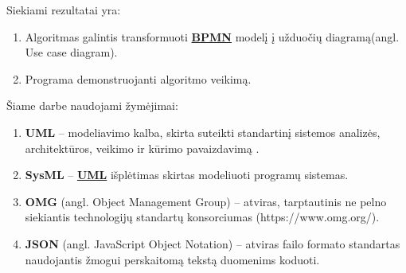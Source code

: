 \documentclass{VUMIFInfBakalaurinis}
\newcommand{\bhyperref}[2]{\hyperref[#1]{\textbf{#2}}}
\newcommand{\BPMN}{\bhyperref{section:bpmn}{BPMN}}
\newcommand{\UML}{\bhyperref{def:uml}{UML}}
\begin{document}
Siekiami rezultatai yra:
\begin{enumerate}
	\item Algoritmas galintis transformuoti \BPMN{} modelį į užduočių diagramą(angl. Use case diagram).
	\item Programa demonstruojanti algoritmo veikimą.
\end{enumerate}







\printbibliography[heading=bibintoc] %

Šiame darbe naudojami žymėjimai:
\begin{enumerate}
	\item \textbf{UML} – modeliavimo kalba, skirta suteikti standartinį sistemos analizės, architektūros, veikimo ir kūrimo pavaizdavimą \cite{omgUmlFormal}. \label{def:uml}
	\item \textbf{SysML} – \UML{} išplėtimas skirtas modeliuoti programų sistemas. \cite{OMGSysML} \label{def:sysml}
	\item \textbf{OMG} (angl. Object Management Group) – atviras, tarptautinis ne pelno siekiantis technologijų standartų konsorciumas (https://www.omg.org/). \label{def:omg}
  \item \textbf{JSON} (angl. JavaScript Object Notation) – atviras failo formato standartas naudojantis žmogui perskaitomą tekstą duomenims koduoti. \label{def:json}
\end{enumerate}
\end{document}
